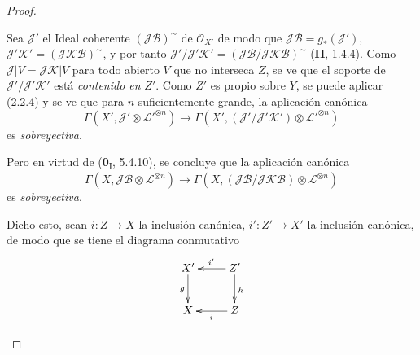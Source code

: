 \begin{proof}
\begin{env}[2.6.2.5]
Sea $\mathcal J'$ el Ideal coherente $(\mathcal J\mathcal B)^\sim$ de
$\mathcal O_{X'}$ de modo que $\mathcal J\mathcal B=g_*(\mathcal J')$,
$\mathcal J'\mathcal K'=(\mathcal J\mathcal K\mathcal B)^\sim$, y por
tanto
$\mathcal J'/\mathcal J'\mathcal K'
=(\mathcal J\mathcal B/\mathcal J\mathcal K\mathcal B)^\sim$
(\textbf{II}, 1.4.4). Como $\mathcal J|V=\mathcal J\mathcal K|V$ para todo
abierto $V$ que no interseca $Z$, se ve que el soporte de
$\mathcal J'/\mathcal J'\mathcal K'$ está \emph{contenido en} $Z'$. Como $Z'$ es
propio sobre $Y$, se puede aplicar (\hyperref[III.2.2.4-fr]{2.2.4}) y se
ve que para $n$ suficientemente grande, la aplicación canónica
\[
\Gamma(X',\mathcal J'\otimes\mathcal L'^{\otimes n})
\longrightarrow
\Gamma(X',(\mathcal J'/\mathcal J'\mathcal K')
\otimes\mathcal L'^{\otimes n})
\]
es \emph{sobreyectiva}.

Pero en virtud de (\textbf{0}\textsubscript{I}, 5.4.10), se
concluye que la aplicación canónica
\[
\Gamma(X,\mathcal J\mathcal B\otimes\mathcal L^{\otimes n})
\longrightarrow
\Gamma(X,(\mathcal J\mathcal B/\mathcal J\mathcal K\mathcal B)
\otimes\mathcal L^{\otimes n})
\]
es \emph{sobreyectiva}.

Dicho esto, sean $i:Z\to X$ la inclusión canónica,
$i':Z'\to X'$ la inclusión canónica, de modo que se tiene el diagrama
conmutativo
\[
\xymatrix{
X'\ar[d]_g & Z'\ar[l]_{i'}\ar[d]^{h}\\
X & Z\ar[l]^{i}
}
\]


\end{env}
\end{proof}
